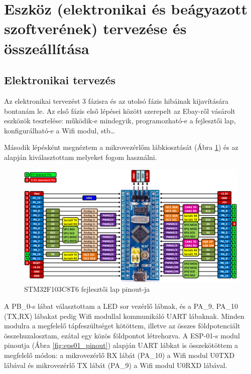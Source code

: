 \documentclass[../main.tex]{subfiles}
\begin{document}
\section{Eszköz (elektronikai és beágyazott szoftverének) tervezése és összeállítása}
    \subsection{Elektronikai tervezés}
        Az elektronikai tervezést 3 fázisra és az utolsó fázis hibáinak kijavítására bontanám le. Az első fázis első lépései között szerepelt az Ebay-ről vásárolt eszközök tesztelése: működik-e mindegyik, programozható-e a fejlesztői lap, konfigurálható-e a Wifi modul, stb\ldots
        
        Második lépésként megnéztem a mikrovezérlőm lábkiosztását (Ábra \ref{fig:stm32f103_pinout}) és az alapján kiválasztottam melyeket fogom használni. 
        
        \begin{figure}[h!]
            \centering
            \includegraphics[width=14cm]{resources/pcb_res/stm32f103c8t6_pinout.png}
            \caption{STM32F103C8T6 fejlesztői lap pinout-ja}
            \label{fig:stm32f103_pinout}
        \end{figure}
        
        A PB\_0-s lábat választottam a LED sor vezérlő lábnak, és a PA\_9, PA\_10 (TX,RX) lábakat pedig Wifi modullal kommunikáló UART lábaknak. Minden modulra a megfelelő tápfeszültséget kötöttem, illetve az összes földpotenciált összehuzalosztam, ezátal egy közös földpontot létrehozva. A ESP-01-s modul pinoutja (Ábra \ref{fig:eps01_pinout}) alapján UART lábkat is összekötöttem a megfelelő módon: a mikrovezérlő RX lábát (PA\_10) a Wifi modul U0TXD lábával és mikrovezérlő TX lábát (PA\_9) a Wifi modul U0RXD lábával. 
        
\end{document}
